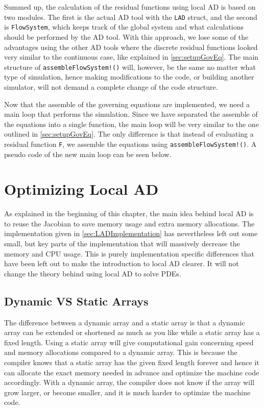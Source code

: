 Summed up, the calculation of the residual functions using local AD is based on two modules. The first is the actual AD tool with the \texttt{LAD} struct, and the second is \texttt{FlowSystem}, which keeps track of the global system and what calculations should be performed by the AD tool. With this approach, we lose some of the advantages using the other AD tools where the discrete residual functions looked very similar to the continuous case, like explained in \autoref{sec:setupGovEq}. The main structure of \texttt{assembleFlowSystem!()} will, however, be the same no matter what type of simulation, hence making modifications to the code, or building another simulator, will not demand a complete change of the code structure.

Now that the assemble of the governing equations are implemented, we need a main loop that performs the simulation. Since we have separated the assemble of the equations into a single function, the main loop will be very similar to the one outlined in \autoref{sec:setupGovEq}. The only difference is that instead of evaluating a residual function \texttt{F}, we assemble the equations using \texttt{assembleFlowSystem!()}. A pseudo code of the new main loop can be seen below. 


\section{Optimizing Local AD}
\label{sec:optimizingLocalAD}
As explained in the beginning of this chapter, the main idea behind local AD is to reuse the Jacobian to save memory usage and extra memory allocations. The implementation given in \autoref{sec:LADImplementation} has nevertheless left out some small, but key parts of the implementation that will massively decrease the memory and CPU usage. This is purely implementation specific differences that have been left out to make the introduction to local AD clearer. It will not change the theory behind using local AD to solve PDEs.

\subsection{Dynamic VS Static Arrays}
The difference between a dynamic array and a static array is that a dynamic array can be extended or shortened as much as you like while a static array has a fixed length. Using a static array will give computational gain concerning speed and memory allocations compared to a dynamic array. This is because the compiler knows that a static array has the given fixed length forever and hence it can allocate the exact memory needed in advance and optimize the machine code accordingly. With a dynamic array, the compiler does not know if the array will grow larger, or become smaller, and it is much harder to optimize the machine code. 

